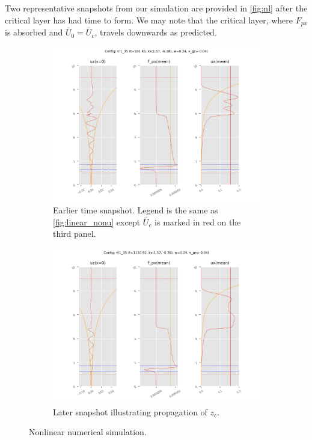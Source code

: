 \documentclass[twocolumn,
        nofootinbib,
        usenames, %
        dvipsnames %
    ]{revtex4-1}%
\begin{document}
Two representative snapshots from our simulation are provided in
\autoref{fig:nl} after the critical layer has had time to form. We may note that
the critical layer, where $F_{px}$ is absorbed and $\bar{U}_0 = \bar{U}_c$,
travels downwards as predicted.
\begin{figure}[h]
    \centering
    \begin{subfigure}{0.5\textwidth}
        \centering
        \includegraphics[width=\textwidth]{plots/nl35_1.png}
        \caption{Earlier time snapshot. Legend is the same as
        \autoref{fig:linear_nonu} except $\bar{U}_c$ is marked in red on the
        third panel.}
    \end{subfigure}

    \begin{subfigure}{0.5\textwidth}
        \centering
        \includegraphics[width=\textwidth]{plots/nl35_2.png}
        \caption{Later snapshot illustrating propagation of $z_c$.}
    \end{subfigure}
    \caption{Nonlinear numerical simulation.}\label{fig:nl}
\end{figure}
\end{document}
